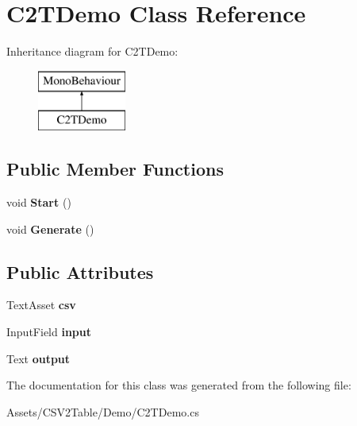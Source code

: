 \hypertarget{class_c2_t_demo}{}\section{C2\+T\+Demo Class Reference}
\label{class_c2_t_demo}
Inheritance diagram for C2\+T\+Demo\+:\begin{figure}[H]
\begin{center}
\leavevmode
\includegraphics[height=2.000000cm]{class_c2_t_demo}
\end{center}
\end{figure}
\subsection*{Public Member Functions}
\begin{DoxyCompactItemize}
\item 
void {\bfseries Start} ()\hypertarget{class_c2_t_demo_af46a674df89fe79d41c44e1cb2f05c1d}{}\label{class_c2_t_demo_af46a674df89fe79d41c44e1cb2f05c1d}

\item 
void {\bfseries Generate} ()\hypertarget{class_c2_t_demo_ac8f7bad437b7fbc5977db39a8b13ef31}{}\label{class_c2_t_demo_ac8f7bad437b7fbc5977db39a8b13ef31}

\end{DoxyCompactItemize}
\subsection*{Public Attributes}
\begin{DoxyCompactItemize}
\item 
Text\+Asset {\bfseries csv}\hypertarget{class_c2_t_demo_a244e85a70169e925ceae55453d6b341e}{}\label{class_c2_t_demo_a244e85a70169e925ceae55453d6b341e}

\item 
Input\+Field {\bfseries input}\hypertarget{class_c2_t_demo_ad0be7a50ea2cdf9312e83575cd6559b0}{}\label{class_c2_t_demo_ad0be7a50ea2cdf9312e83575cd6559b0}

\item 
Text {\bfseries output}\hypertarget{class_c2_t_demo_aeb12919a5ec0e1d04218732416532f4d}{}\label{class_c2_t_demo_aeb12919a5ec0e1d04218732416532f4d}

\end{DoxyCompactItemize}


The documentation for this class was generated from the following file\+:\begin{DoxyCompactItemize}
\item 
Assets/\+C\+S\+V2\+Table/\+Demo/C2\+T\+Demo.\+cs\end{DoxyCompactItemize}
